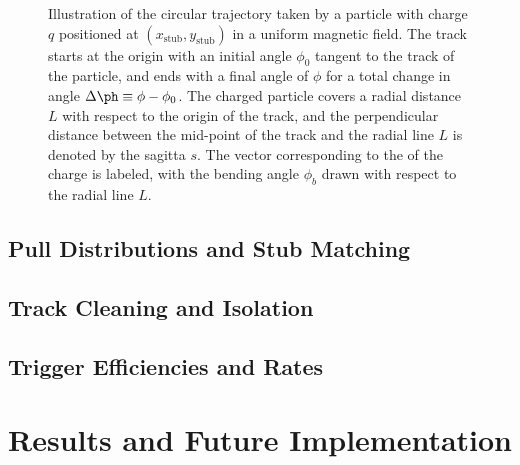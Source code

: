 \begin{figure}[htbp]
  \centering
  
  \caption{Illustration of the circular trajectory taken by a particle with charge $q$ positioned at $(x_\mathrm{stub},y_\mathrm{stub})$ in a uniform magnetic field. The track starts at the origin with an initial angle $\phi_0$ tangent to the track of the particle, and ends with a final angle of $\phi$ for a total change in angle $\Delta\ph\equiv\phi-\phi_0$. The charged particle covers a radial distance $L$ with respect to the origin of the track, and the perpendicular distance between the mid-point of the track and the radial line $L$ is denoted by the sagitta $s$. The vector corresponding to the \pt of the charge is labeled, with the bending angle $\phi_b$ drawn with respect to the radial line $L$.}
  \label{fig:arc}
\end{figure}


\subsection{Pull Distributions and Stub Matching}
\label{subsec:pulls}

\subsection{Track Cleaning and Isolation}
\label{subsec:cleaning}

\subsection{Trigger Efficiencies and Rates}
\label{subsec:rates}

\section{Results and Future Implementation}
\label{subsec:TPSResults}
